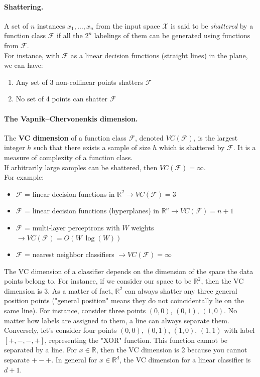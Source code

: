 \paragraph*{Shattering.} A set of $n$ instances $x_1, \dots, x_n$ from the input space $\mathcal{X}$ is said to be \textit{shattered} by a function class $\mathcal{ F }$ if all the $2^n$ labelings of them can be generated using functions from $\mathcal{ F }$.\\ 
For instance, with $\mathcal{ F }$ as a linear decision functions (straight lines) in the plane, we can have:
\begin{enumerate}[label=(\alph*)]
	\item Any set of 3 non-collinear points shatters $\mathcal{ F }$
	\item No set of 4 points can shatter $\mathcal{ F }$
\end{enumerate}

\paragraph*{The Vapnik–Chervonenkis dimension.} The \textbf{VC dimension} of a function class $\mathcal{ F }$, denoted $VC(\mathcal{ F })$, is the largest integer $h$ such that there exists a sample of size $h$ which is shattered by $\mathcal{ F }$. It is a measure of complexity of a function class.\\
If arbitrarily large samples can be shattered, then $VC(\mathcal{ F }) = \infty$.\\
For example:
\begin{itemize}
	\item $\mathcal{ F }$ = linear decision functions in $\mathbb{R}^2 \rightarrow VC(\mathcal{ F }) = 3$
	\item $\mathcal{ F }$ = linear decision functions (hyperplanes) in $\mathbb{R}^n \rightarrow VC(\mathcal{ F }) = n+1$ 
	\item $\mathcal{ F }$ = multi-layer perceptrons with $W$ weights $\rightarrow VC(\mathcal{ F }) = O(W~\log( W))$
	\item $\mathcal{ F }$ = nearest neighbor classifiers $\rightarrow VC(\mathcal{ F }) = \infty$
\end{itemize}


The VC dimension of a classifier depends on the dimension of the space the data points belong to. For instance, if we consider our space to be $\mathbb{R}^2$, then the VC dimension is $3$. As a matter of fact,  $\mathbb{R}^2$ can always shatter any three general position points ("general position" means they do not coincidentally lie on the same line). For instance, consider three points $(0,0)$, $(0,1)$, $(1,0)$. No matter how labels are assigned to them, a line can always separate them. Conversely, let's consider four points $(0,0)$, $(0,1)$, $(1,0)$, $(1,1)$ with label $[+,-,-,+]$, representing the "XOR" function. This function cannot be separated by a line. For $x\in\mathbb{R}$, then the VC dimension is 2 because you cannot separate $+-+$. In general for $x\in\mathbb{R}^d$, the VC dimension for a linear classifier is $d+1$.\\

